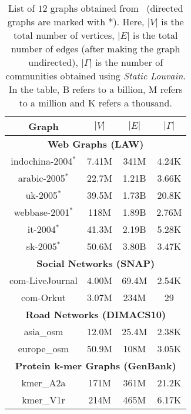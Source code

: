 \begin{table}[hbtp]
  \centering
  \caption{List of $12$ graphs obtained from~\cite{suite19} (directed graphs are marked with $*$). Here, $|V|$ is the total number of vertices, $|E|$ is the total number of edges (after making the graph undirected), $|\Gamma|$ is the number of communities obtained using \textit{Static Louvain}. In the table, B refers to a billion, M refers to a million and K refers a thousand.}
  \label{tab:dataset}
  \begin{tabular}{|c||c|c|c|}
    \toprule
    \textbf{Graph} &
    \textbf{\textbf{$|V|$}} &
    \textbf{\textbf{$|E|$}} &
    \textbf{\textbf{$|\Gamma|$}} \\
    \midrule
    \multicolumn{4}{|c|}{\textbf{Web Graphs (LAW)}} \\ \hline
    indochina-2004$^*$ & 7.41M & 341M & 4.24K \\ \hline  %
    arabic-2005$^*$ & 22.7M & 1.21B & 3.66K \\ \hline  %
    uk-2005$^*$ & 39.5M & 1.73B & 20.8K \\ \hline  %
    webbase-2001$^*$ & 118M & 1.89B & 2.76M \\ \hline  %
    it-2004$^*$ & 41.3M & 2.19B & 5.28K \\ \hline  %
    sk-2005$^*$ & 50.6M & 3.80B & 3.47K \\ \hline  %
    \multicolumn{4}{|c|}{\textbf{Social Networks (SNAP)}} \\ \hline
    com-LiveJournal & 4.00M & 69.4M & 2.54K \\ \hline  %
    com-Orkut & 3.07M & 234M & 29 \\ \hline  %
    \multicolumn{4}{|c|}{\textbf{Road Networks (DIMACS10)}} \\ \hline
    asia\_osm & 12.0M & 25.4M & 2.38K \\ \hline  %
    europe\_osm & 50.9M & 108M & 3.05K \\ \hline  %
    \multicolumn{4}{|c|}{\textbf{Protein k-mer Graphs (GenBank)}} \\ \hline
    kmer\_A2a & 171M & 361M & 21.2K \\ \hline  %
    kmer\_V1r & 214M & 465M & 6.17K \\ \hline  %
  \bottomrule
  \end{tabular}
\end{table}
